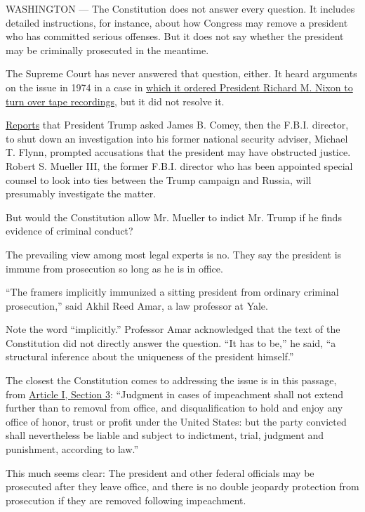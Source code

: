 WASHINGTON --- The Constitution does not answer every question. It
includes detailed instructions, for instance, about how Congress may
remove a president who has committed serious offenses. But it does not
say whether the president may be criminally prosecuted in the meantime.

The Supreme Court has never answered that question, either. It heard
arguments on the issue in 1974 in a case in
\href{http://caselaw.findlaw.com/us-supreme-court/418/683.html}{which it
ordered President Richard M. Nixon to turn over tape recordings}, but it
did not resolve it.

\href{https://www.nytimes3xbfgragh.onion/2017/05/16/us/politics/james-comey-trump-flynn-russia-investigation.html?_r=0}{Reports}
that President Trump asked James B. Comey, then the F.B.I. director, to
shut down an investigation into his former national security adviser,
Michael T. Flynn, prompted accusations that the president may have
obstructed justice. Robert S. Mueller III, the former F.B.I. director
who has been appointed special counsel to look into ties between the
Trump campaign and Russia, will presumably investigate the matter.

But would the Constitution allow Mr. Mueller to indict Mr. Trump if he
finds evidence of criminal conduct?

The prevailing view among most legal experts is no. They say the
president is immune from prosecution so long as he is in office.

``The framers implicitly immunized a sitting president from ordinary
criminal prosecution,'' said Akhil Reed Amar, a law professor at Yale.

Note the word ``implicitly.'' Professor Amar acknowledged that the text
of the Constitution did not directly answer the question. ``It has to
be,'' he said, ``a structural inference about the uniqueness of the
president himself.''

The closest the Constitution comes to addressing the issue is in this
passage, from
\href{https://www.law.cornell.edu/constitution/articlei\#section3}{Article
I, Section 3}: ``Judgment in cases of impeachment shall not extend
further than to removal from office, and disqualification to hold and
enjoy any office of honor, trust or profit under the United States: but
the party convicted shall nevertheless be liable and subject to
indictment, trial, judgment and punishment, according to law.''

This much seems clear: The president and other federal officials may be
prosecuted after they leave office, and there is no double jeopardy
protection from prosecution if they are removed following impeachment.

